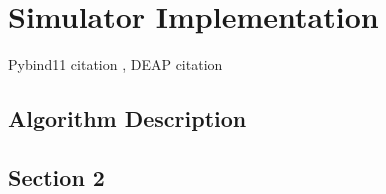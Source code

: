 \chapter{Simulator Implementation}

Pybind11 citation \cite{jakob2017pybind11}, DEAP citation \cite{fortin2012deap}

\section{Algorithm Description}

\section{Section 2}
